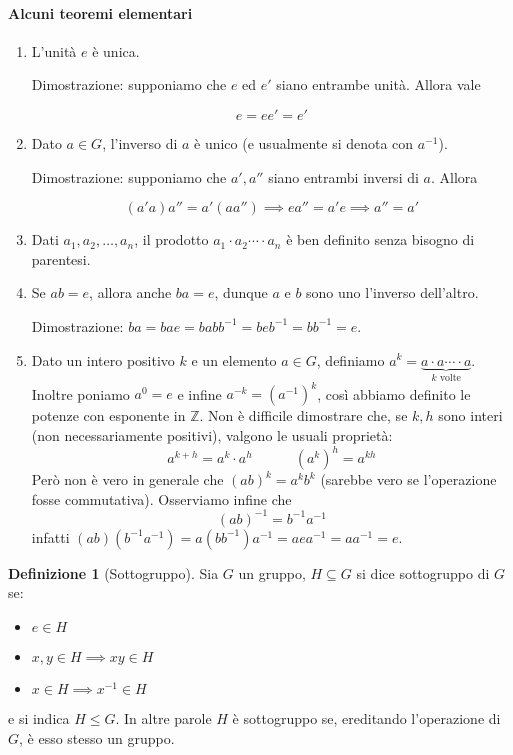 \documentclass[11pt]{article}
\theoremstyle{plain}
\theoremstyle{definition}
\newtheorem{defn}{Definizione}[section]
\theoremstyle{remark}
\newcommand{\Z}{\mathbb{Z}}
\begin{document}
\paragraph{Alcuni teoremi elementari}
\begin{enumerate}
	\item L'unità $e$ è unica.
	
	Dimostrazione: supponiamo che $e$ ed $e'$ siano entrambe unità. Allora vale
	
	\[e = ee' = e' \]
	
	\item Dato $a\in G$, l'inverso di $a$ è unico (e usualmente si denota con $a^{-1}$).

	Dimostrazione: supponiamo che $a', a''$ siano entrambi inversi di $a$. Allora
		
	\[(a' a)a'' = a'(aa'') \implies e a'' = a' e \implies a'' = a' \]
	
	\item Dati $a_1, a_2, \ldots, a_n$, il prodotto $a_1\cdot a_2 \cdots\cdot a_n$ è ben definito senza bisogno di parentesi.
	\item Se $ab = e$, allora anche $ba = e$, dunque $a$ e $b$ sono uno l'inverso dell'altro.

	Dimostrazione: $ba = bae = babb^{-1} = beb^{-1} = bb^{-1} = e$.
	
	\item Dato un intero positivo $k$ e un elemento $a\in G$, definiamo $a^k=\underbrace{a\cdot a \cdots\cdot a}_{k\text{ volte}}$.
	Inoltre poniamo $a^0 = e$ e infine $a^{-k} = (a^{-1})^k$, così abbiamo definito le potenze con esponente in $\Z$.
	Non è difficile dimostrare che, se $k,h$ sono interi (non necessariamente positivi), valgono le usuali proprietà: 
	\[a^{k+h} = a^k \cdot a^h \quad\quad\quad (a^k)^h = a^{kh} \]
	Però non è vero in generale che $(ab)^k = a^kb^k$ (sarebbe vero se l'operazione fosse commutativa). Osserviamo infine che 
	\[ (ab)^{-1} = b^{-1}a^{-1}\]
	infatti $(ab)(b^{-1} a^{-1}) = a(bb^{-1})a^{-1} = aea^{-1} = aa^{-1} = e$.
\end{enumerate}



\begin{defn}[Sottogruppo]
Sia $G$ un gruppo, $H\subseteq G$ si dice sottogruppo di $G$ se:
\begin{itemize}
	\item $e\in H$
	\item $x,y\in H \implies xy\in H$
	\item $x\in H \implies x^{-1}\in H$
\end{itemize}
e si indica $H \leq G$. In altre parole $H$ è sottogruppo se,
ereditando l'operazione di $G$, è esso stesso un gruppo.
\end{defn}
\end{document}
